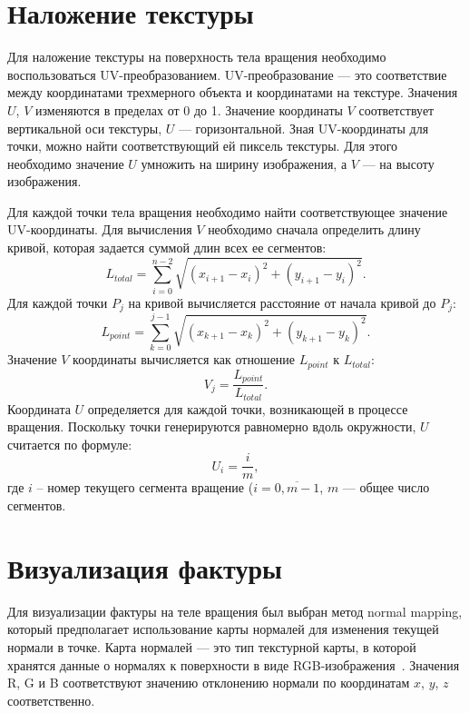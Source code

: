 \section{Наложение текстуры}
Для наложение текстуры на поверхность тела вращения необходимо воспользоваться UV-преобразованием. UV-преобразование --- это соответствие между координатами трехмерного объекта и координатами на текстуре. Значения $U$, $V$ изменяются в пределах от 0 до 1. Значение координаты $V$ соответствует вертикальной оси текстуры, $U$ --- горизонтальной. Зная UV-координаты для точки, можно найти соответствующий ей пиксель текстуры. Для этого необходимо значение $U$ умножить на ширину изображения, а $V$ --- на высоту изображения. 

Для каждой точки тела вращения необходимо найти соответствующее значение UV-координаты. Для вычисления $V$ необходимо сначала определить длину кривой, которая задается суммой длин всех ее сегментов:
\begin{equation}
    L_{total} = \displaystyle\sum_{i=0}^{n-2} \sqrt{(x_{i+1} - x_i)^2 + (y_{i+1}-y_i)^2}.
\end{equation}
Для каждой точки $P_j$ на кривой вычисляется расстояние от начала кривой до $P_j$:
\begin{equation}
    L_{point} = \displaystyle\sum_{k=0}^{j-1} \sqrt{(x_{k+1} - x_k)^2 + (y_{k+1}-y_k)^2}.
\end{equation}
Значение $V$ координаты вычисляется как отношение $L_{point}$ к $L_{total}$:
\begin{equation}
    V_j = \frac{L_{point}}{L_{total}}.
\end{equation}
Координата $U$ определяется для каждой точки, возникающей в процессе вращения. Поскольку точки генерируются равномерно вдоль окружности, $U$ считается по формуле:
\begin{equation}
    U_i = \frac{i}{m},
\end{equation}
где $i$ -- номер текущего сегмента вращение ($i = \overline{0, m-1}$, $m$ --- общее число сегментов.

\section{Визуализация фактуры}
Для визуализации фактуры на теле вращения был выбран метод normal mapping, который предполагает использование карты нормалей для изменения текущей нормали в точке. Карта нормалей --- это тип текстурной карты, в которой хранятся данные о нормалях к поверхности в виде RGB-изображения~\cite{Карта_нормалей}. Значения R, G и B соответствуют значению отклонению нормали по координатам $x$, $y$, $z$ соответственно.


